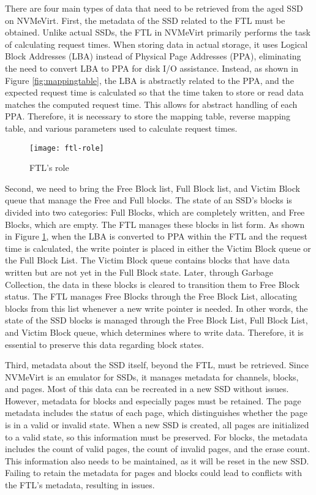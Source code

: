 There are four main types of data that need to be retrieved from the aged SSD on NVMeVirt.
First, the metadata of the SSD related to the FTL must be obtained.
Unlike actual SSDs, the FTL in NVMeVirt primarily performs the task of calculating request times.
When storing data in actual storage, it uses Logical Block Addresses (LBA) instead of Physical Page Addresses (PPA), eliminating the need to convert LBA to PPA for disk I/O assistance.
Instead, as shown in Figure \ref{fig:mappingtable}, the LBA is abstractly related to the PPA, and the expected request time is calculated so that the time taken to store or read data matches the computed request time.
This allows for abstract handling of each PPA.
Therefore, it is necessary to store the mapping table, reverse mapping table, and various parameters used to calculate request times.


\begin{figure}[t]
    \centering
    \texttt{[image: ftl-role]}
    \caption{FTL’s role}
    \label{fig:role}
\end{figure}

Second, we need to bring the Free Block list, Full Block list, and Victim Block queue that manage the Free and Full blocks.
The state of an SSD's blocks is divided into two categories: Full Blocks, which are completely written, and Free Blocks, which are empty.
The FTL manages these blocks in list form.
As shown in Figure \ref{fig:role}, when the LBA is converted to PPA within the FTL and the request time is calculated, the write pointer is placed in either the Victim Block queue or the Full Block List.
The Victim Block queue contains blocks that have data written but are not yet in the Full Block state.
Later, through Garbage Collection, the data in these blocks is cleared to transition them to Free Block status.
The FTL manages Free Blocks through the Free Block List, allocating blocks from this list whenever a new write pointer is needed.
In other words, the state of the SSD blocks is managed through the Free Block List, Full Block List, and Victim Block queue, which determines where to write data.
Therefore, it is essential to preserve this data regarding block states.

Third, metadata about the SSD itself, beyond the FTL, must be retrieved.
Since NVMeVirt is an emulator for SSDs, it manages metadata for channels, blocks, and pages.
Most of this data can be recreated in a new SSD without issues.
However, metadata for blocks and especially pages must be retained.
The page metadata includes the status of each page, which distinguishes whether the page is in a valid or invalid state.
When a new SSD is created, all pages are initialized to a valid state, so this information must be preserved.
For blocks, the metadata includes the count of valid pages, the count of invalid pages, and the erase count.
This information also needs to be maintained, as it will be reset in the new SSD.
Failing to retain the metadata for pages and blocks could lead to conflicts with the FTL's metadata, resulting in issues.

